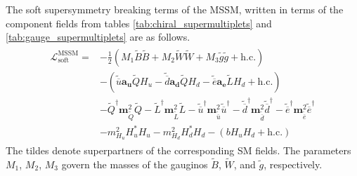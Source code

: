 The soft supersymmetry breaking terms of the MSSM, written in terms of the component fields from tables \ref{tab:chiral_supermultiplets} and \ref{tab:gauge_supermultiplets} are as follows.
\begin{align*}
  \begin{split}
    \mathcal{L}_\text{soft}^\text{MSSM} = &-\frac{1}{2}\left(M_1\widetilde{B}\widetilde{B}+
    M_2\widetilde{W}\widetilde{W} + M_3\widetilde{g}\widetilde{g} + \text{h.c.}\right)\\
    &-\left(\widetilde{\overline{u}}\mathbf{a_u}\widetilde{Q}H_u-
    \widetilde{\overline{d}}\mathbf{a_d}\widetilde{Q}H_d-
    \widetilde{\overline{e}}\mathbf{a_e}\widetilde{L}H_d+\text{h.c.}\right)\\
    &-\widetilde{Q}^\dagger\mathbf{m}_{\widetilde{Q}}^2\widetilde{Q}
     -\widetilde{L}^\dagger\mathbf{m}_{\widetilde{L}}^2\widetilde{L}
     -\widetilde{\overline{u}}^\dagger\mathbf{m}_{\widetilde{\overline{u}}}^2\widetilde{\overline{u}}^\dagger
     -\widetilde{\overline{d}}^\dagger\mathbf{m}_{\widetilde{\overline{d}}}^2\widetilde{\overline{d}}^\dagger
     -\widetilde{\overline{e}}^\dagger\mathbf{m}_{\widetilde{\overline{e}}}^2\widetilde{\overline{e}}^\dagger\\
     &-m^2_{H_u}H^*_uH_u-m^2_{H_d}H_d^*H_d-(bH_uH_d+\text{h.c.}) 
  \end{split}
  \label{eq:soft_susy_breaking_terms}
\end{align*}
The tildes denote superpartners of the corresponding SM fields. The parameters $M_1$, $M_2$, $M_3$ govern the masses of the gauginos $\widetilde{B}$, $\widetilde{W}$, and $\widetilde{g}$, respectively.


